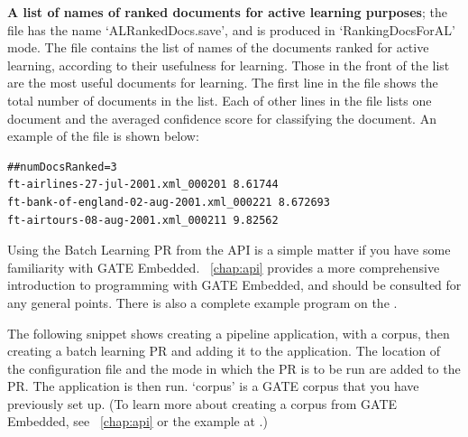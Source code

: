 {\bf A list of names of ranked documents for active learning purposes}; the file
has the name `ALRankedDocs.save', and is produced in `RankingDocsForAL'
mode. The file contains the list of names of the documents ranked for active
learning, according to their usefulness for learning. Those in the front of the
list are the most useful documents for learning. The first line in the file shows
the total number of documents in the list. Each of other lines in the file lists
one document and the averaged confidence score for classifying the document. An
example of the file is shown below:

\begin{small}\begin{verbatim}
##numDocsRanked=3
ft-airlines-27-jul-2001.xml_000201 8.61744
ft-bank-of-england-02-aug-2001.xml_000221 8.672693
ft-airtours-08-aug-2001.xml_000211 9.82562
\end{verbatim}\end{small}


Using the Batch Learning PR from the API is a simple matter if you have some
familiarity with GATE Embedded. \Chapthing~\ref{chap:api} provides a more
comprehensive introduction to programming with GATE Embedded, and should be
consulted for any general points. There is also a complete example program on
the .

The following snippet shows creating a pipeline application, with a corpus,
then creating a batch learning PR and adding it to the application. The
location of the configuration file and the mode in which the PR is to be run
are added to the PR. The application is then run. `corpus' is a GATE corpus
that you have previously set up. (To learn more about creating a corpus from
GATE Embedded, see \chapthing~\ref{chap:api} or the example at
.)

